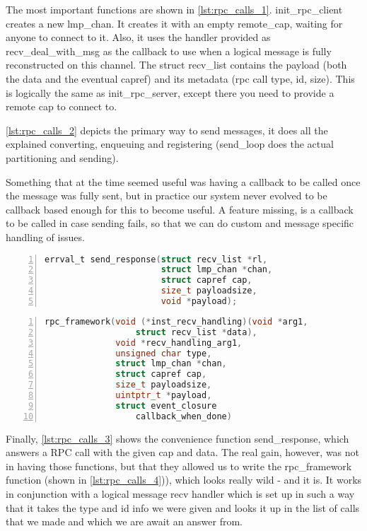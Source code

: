 The most important functions are shown in \autoref{lst:rpc_calls_1}.
init\_rpc\_client creates a new lmp\_chan. It 
creates it with an empty remote\_cap, waiting for anyone to connect to it. 
Also, it uses the handler provided as recv\_deal\_with\_msg as the callback to 
use when a logical message is fully reconstructed on this channel. The struct 
recv\_list contains the payload (both the data and the eventual capref) 
and its metadata (rpc call type, id, size).
This is logically the same as init\_rpc\_server, except there you need to provide 
 a remote cap to connect to.
\medskip

\autoref{lst:rpc_calls_2} depicts the primary way to send messages, it does 
all the explained converting, enqueuing and registering (send\_loop does the 
actual partitioning and sending).
\medskip

Something that at the time seemed useful was having a callback to be called 
once the message was fully sent, but in practice our system never evolved to 
be callback based enough for this to become useful. 
A feature missing, is a callback to be called in case sending fails, so 
that we can do custom and message specific handling of issues.
\medskip

\begin{lstlisting}[caption={RPC send\_response prototype}, 
label=lst:rpc_calls_3, numbers=left, stepnumber=1, float, floatplacement=tl, 
frame=tb, language=c]
errval_t send_response(struct recv_list *rl, 
                       struct lmp_chan *chan,
                       struct capref cap, 
                       size_t payloadsize, 
                       void *payload);
\end{lstlisting}
\begin{lstlisting}[caption={rpc\_framework prototype}, 
label=lst:rpc_calls_4, numbers=left, stepnumber=1, float, floatplacement=tl, 
frame=tb, language=c]
rpc_framework(void (*inst_recv_handling)(void *arg1, 
                  struct recv_list *data),
              void *recv_handling_arg1,
              unsigned char type,
              struct lmp_chan *chan, 
              struct capref cap, 
              size_t payloadsize, 
              uintptr_t *payload,
              struct event_closure 
                  callback_when_done)
\end{lstlisting}

Finally, \autoref{lst:rpc_calls_3} shows the convenience function 
send\_response, which answers a RPC call with the given cap and data. 
The real gain, however, was not in having those functions, but that they 
allowed us to write the rpc\_framework function (shown in 
\autoref{lst:rpc_calls_4})), which looks really wild - and it is. 
It works in conjunction with a logical message recv handler 
which is set up in such a way that it takes the type and id info we were given 
and looks it up in the list of calls that we made and which we are await an 
answer from.
\medskip

